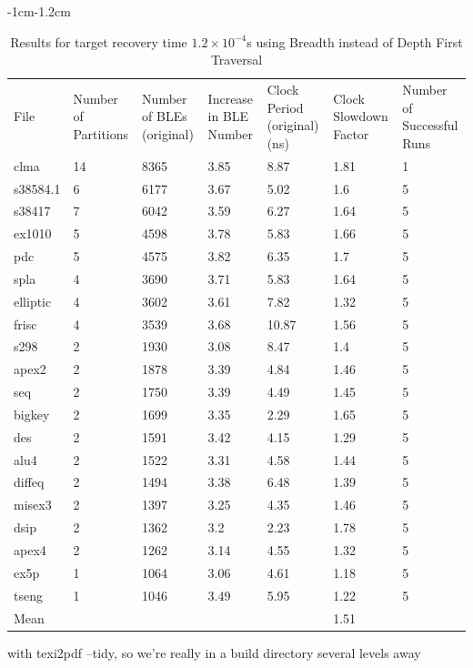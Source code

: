 \documentclass[12pt,final,oneside]{dwThesis} %
\begin{document}
   \begin{table}
      \footnotesize 
      \begin{adjustwidth}
         {-1cm}{-1.2cm}

         \begin{tabularx}
            {1.1\textwidth}{XXXXXXX} \toprule
            File    & Number of Partitions &  Number of BLEs (original) &  Increase in BLE Number &  Clock Period (original) (ns) &  Clock Slowdown Factor &  Number of Successful Runs\\
clma & 14 & 8365 & 3.85 & 8.87 & 1.81 & 1\\
s38584.1 & 6 & 6177 & 3.67 & 5.02 & 1.6 & 5\\
s38417 & 7 & 6042 & 3.59 & 6.27 & 1.64 & 5\\
ex1010 & 5 & 4598 & 3.78 & 5.83 & 1.66 & 5\\
pdc & 5 & 4575 & 3.82 & 6.35 & 1.7 & 5\\
spla & 4 & 3690 & 3.71 & 5.83 & 1.64 & 5\\
elliptic & 4 & 3602 & 3.61 & 7.82 & 1.32 & 5\\
frisc & 4 & 3539 & 3.68 & 10.87 & 1.56 & 5\\
s298 & 2 & 1930 & 3.08 & 8.47 & 1.4 & 5\\
apex2 & 2 & 1878 & 3.39 & 4.84 & 1.46 & 5\\
seq & 2 & 1750 & 3.39 & 4.49 & 1.45 & 5\\
bigkey & 2 & 1699 & 3.35 & 2.29 & 1.65 & 5\\
des & 2 & 1591 & 3.42 & 4.15 & 1.29 & 5\\
alu4 & 2 & 1522 & 3.31 & 4.58 & 1.44 & 5\\
diffeq & 2 & 1494 & 3.38 & 6.48 & 1.39 & 5\\
misex3 & 2 & 1397 & 3.25 & 4.35 & 1.46 & 5\\
dsip & 2 & 1362 & 3.2 & 2.23 & 1.78 & 5\\
apex4 & 2 & 1262 & 3.14 & 4.55 & 1.32 & 5\\
ex5p & 1 & 1064 & 3.06 & 4.61 & 1.18 & 5\\
tseng & 1 & 1046 & 3.49 & 5.95 & 1.22 & 5\\
Mean &  &  &  &  & 1.51 & \\
         \end{tabularx}
         \caption{Results for target recovery time
            $1.2\times10^{-4}$s using Breadth instead of Depth First Traversal}
         \label{Results1.2e-4DFS} 
      \end{adjustwidth}

   \end{table}


   with texi2pdf --tidy, so we're really in a build directory several levels
   away

\end{document}
